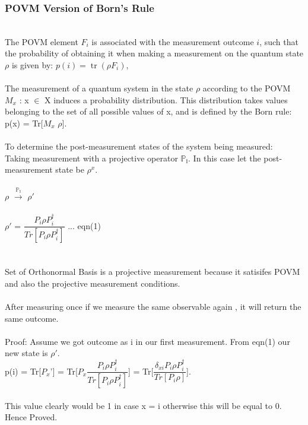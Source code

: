 \documentclass{article}
\begin{document}
\subsubsection{POVM Version of Born's Rule} \\
The POVM element ${\displaystyle F_{i}}$ is associated with the measurement outcome ${\displaystyle i}$, such that the probability of obtaining it when making a measurement on the quantum state ${\displaystyle \rho }$  is given by:
${\displaystyle p(i)=\operatorname {tr} (\rho F_{i}),}$
\\
\\
The measurement of a quantum system in the state $\rho$ according to the POVM
${M_{x}}$ : x $\in$ X induces a probability distribution. This distribution takes values belonging to the set of all possible values of x, and is defined by the Born rule:
p(x) = Tr[${M_{x}}$ $\rho$].
\\
\\
To determine the post-measurement states of the system being measured:
\\
Taking measurement with a projective operator $\mathbb{P_{i}}$.
In this case let the post-measurement state be $\rho ^{x}$.
\\
\\
$\rho$ $\xrightarrow{\text{$\mathbb{P_{i}}$}}$ $\rho '$
\\
\\
$\rho '$ = $\dfrac{P_{i} \rho P_{i} ^ \dagger}{Tr[{P_{i} \rho P_{i} ^ \dagger}]}$ ...  eqn(1)
\\
\\
\\
Set of Orthonormal Basis is a projective measurement because it satisifes POVM and also the projective measurement conditions.
\\
\\
After measuring once if we measure the same observable again , it will return the same outcome.
\\
\\
Proof:
Assume we got outcome as $\mathrm{i}$ in our first measurement. From eqn(1) our new state is $\rho '$.
\\
p(i) = Tr[$P_{x}$\rho '] = Tr[$P_{x}$$\dfrac{P_{i} \rho P_{i} ^ \dagger}{Tr[{P_{i} \rho P_{i} ^ \dagger}]}$] = Tr[$\dfrac{\delta_{xi} P_{i} \rho P_{i} ^ \dagger}{Tr[{P_{i} \rho }]}$].
\\
\\
This value clearly would be 1 in case x = i otherwise this will be equal to 0.
\\
Hence Proved.
\end{document}
